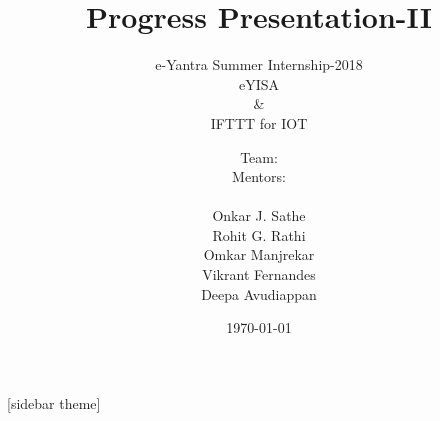 \documentclass[10pt, a4paper]{beamer}
\begin{document}
	\title{Progress Presentation-II}
	\subtitle{e-Yantra Summer Internship-2018
	\vspace{0.1cm}
	\\ eYISA
	\\\&
	\\IFTTT for IOT}
	\author{
		\begin{minipage}[b]{0.40\textwidth}
			\raggedleft
			\hspace{2.2cm}
			Team:
			\newline
			\vspace{0.28cm}
			\\\hspace{1.95cm}Mentors:
			\newline\\\vspace{0.45cm}
		\end{minipage}%
		\begin{minipage}[b]{0.60\textwidth}
			\raggedright
			Onkar J. Sathe
			\\Rohit G. Rathi			
			\vspace{0.3cm}
			\\Omkar Manjrekar
			\\Vikrant Fernandes
			\\Deepa Avudiappan
		\end{minipage}%
	}
	\date{\today}
	\frame{\titlepage}

[sidebar theme]
\end{document}

